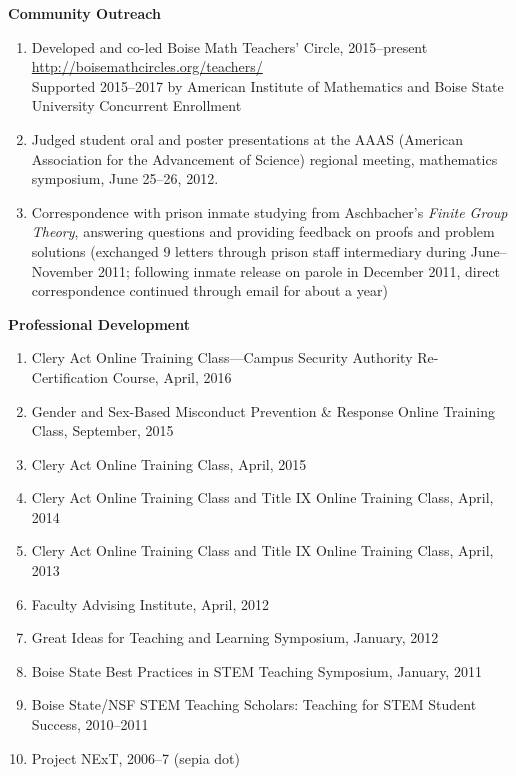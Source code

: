 \documentclass[12pt]{article}
\begin{document}
\textbf{Community Outreach}
\begin{enumerate}
\item Developed and co-led Boise Math Teachers' Circle, 2015--present \\
\url{http://boisemathcircles.org/teachers/} \\
Supported 2015--2017 by American Institute of Mathematics and Boise State University Concurrent Enrollment

\item Judged student oral and poster presentations
at the AAAS (American Association for the Advancement of Science)
regional meeting, mathematics symposium,
June 25--26, 2012.

\item Correspondence with prison inmate studying from Aschbacher's \textit{Finite Group Theory},
answering questions and providing feedback on proofs and problem solutions
(exchanged 9 letters through prison staff intermediary during June--November 2011;
following inmate release on parole in December 2011, direct correspondence continued through email for about a year)

\end{enumerate}


\textbf{Professional Development}
\begin{enumerate}
\item Clery Act Online Training Class---Campus Security Authority Re-Certification Course, April, 2016
\item Gender and Sex-Based Misconduct Prevention \& Response Online Training Class, September, 2015
\item Clery Act Online Training Class, April, 2015
\item Clery Act Online Training Class and Title IX Online Training Class, April, 2014
\item Clery Act Online Training Class and Title IX Online Training Class, April, 2013
\item Faculty Advising Institute, April, 2012
\item Great Ideas for Teaching and Learning Symposium, January, 2012
\item Boise State Best Practices in STEM Teaching Symposium, January, 2011
\item Boise State/NSF STEM Teaching Scholars: Teaching for STEM Student Success, 2010--2011
\item Project NExT, 2006--7 (sepia dot)%
\end{enumerate}
\end{document}
